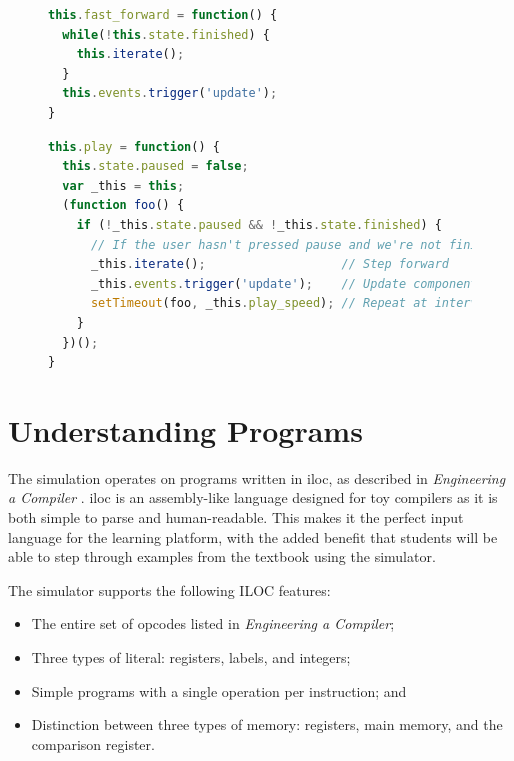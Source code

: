 \documentclass[bsc,twoside,singlespacing,parskip,logo,notimes,normalheadings]{infthesis}
\begin{document}
    \begin{figure}[!ht]
      \begin{lstlisting}[language=JavaScript, caption={JavaScript Implementation of Fast Forward}, label={lst:fast_forward}]
this.fast_forward = function() {
  while(!this.state.finished) {
    this.iterate();
  }
  this.events.trigger('update');
}
      \end{lstlisting}
    \end{figure}

    \begin{figure}
      \begin{lstlisting}[language=JavaScript, caption={JavaScript Implementation of Automatic Playback}, label={lst:autoplay}]
this.play = function() {
  this.state.paused = false;
  var _this = this;
  (function foo() {
    if (!_this.state.paused && !_this.state.finished) {
      // If the user hasn't pressed pause and we're not finished
      _this.iterate();                   // Step forward
      _this.events.trigger('update');    // Update components
      setTimeout(foo, _this.play_speed); // Repeat at interval
    }
  })();
}
      \end{lstlisting}
    \end{figure}
    
    \section{Understanding Programs}
    The simulation operates on programs written in \gls{iloc}, as
    described in {\em Engineering a Compiler}
    \cite[appx.~A]{eac}. \gls{iloc} is an assembly-like language
    designed for toy compilers as it is both simple to parse and
    human-readable. This makes it the perfect input language for the
    learning platform, with the added benefit that students will be
    able to step through examples from the textbook using the
    simulator.

    The simulator supports the following ILOC features:

    \begin{itemize}
    \item The entire set of opcodes listed in {\em Engineering a
        Compiler};
    \item Three types of literal: registers, labels, and integers;
    \item Simple programs with a single operation per instruction; and
    \item Distinction between three types of memory: registers, main
      memory, and the comparison register.
    \end{itemize}
\end{document}
